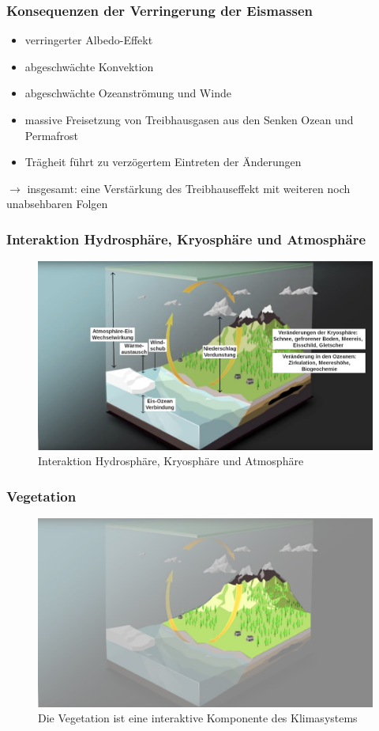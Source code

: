 \begin{frame}
	\frametitle{Konsequenzen der Verringerung der Eismassen}
	\begin{itemize}
		\item verringerter Albedo-Effekt
		\item abgeschwächte Konvektion
		\item abgeschwächte Ozeanströmung und Winde
		\item massive Freisetzung von Treibhausgasen aus den Senken Ozean und Permafrost
		\item Trägheit führt zu verzögertem Eintreten der Änderungen
	\end{itemize}
	
	$\rightarrow$ insgesamt: eine Verstärkung des Treibhauseffekt mit weiteren noch unabsehbaren Folgen
\end{frame}

\begin{frame}
	\frametitle{Interaktion Hydrosphäre, Kryosphäre und Atmosphäre}
	\begin{figure}
		\centering
		\includegraphics{bilder/WMO_Cycles_factors_waterAndIce.png}
		\caption{Interaktion Hydrosphäre, Kryosphäre und Atmosphäre}
	\end{figure}
\end{frame}

\begin{frame}
	\frametitle{Vegetation}
	
	\begin{figure}
		\centering
		\includegraphics{bilder/WMO_Cycles_land.png}
		\caption{Die Vegetation ist eine interaktive Komponente des Klimasystems}
	\end{figure}
\end{frame}


